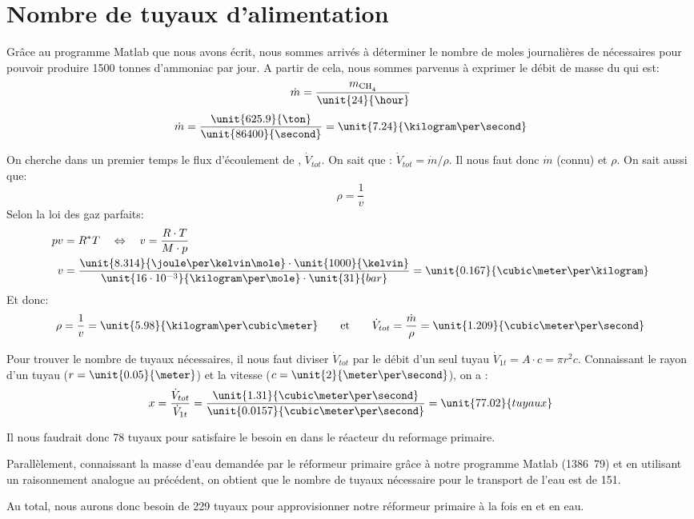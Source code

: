 \section{Nombre de tuyaux d'alimentation}

Grâce au programme Matlab que nous avons écrit, nous sommes arrivés à déterminer le nombre de moles journalières de  nécessaires pour pouvoir produire 1500 tonnes d'ammoniac par jour. A partir de cela, nous sommes parvenus à exprimer le débit de masse du  qui est:
    $$\dot{m}=\frac{m_{\ce{CH4}}}{\unit{24}{\hour}}$$
    $$\dot{m}=\frac{\unit{625.9}{\ton}}{\unit{86400}{\second}}=\unit{7.24}{\kilogram\per\second}$$

On cherche dans un premier temps le flux d'écoulement de , $\dot{V}_{tot}$. On sait que :
$\dot{V}_{tot}={\dot{m}}/{\rho}$.
Il nous faut donc $\dot{m}$ (connu) et $\rho$. On sait aussi que:
\[ \rho = \frac{1}{v} \]
Selon la loi des gaz parfaits:
\begin{align*}
    pv &= R^{*}T \quad\Leftrightarrow\quad v = \frac{R\cdot T}{M\cdot p} \\
    v &= \frac{\unit{8.314}{\joule\per\kelvin\mole}\cdot\unit{1000}{\kelvin}}{\unit{16\cdot10^{-3}}{\kilogram\per\mole}\cdot\unit{31}{bar}}=\unit{0.167}{\cubic\meter\per\kilogram}
\end{align*}
Et donc:
\[
    \rho = \frac{1}{v} = \unit{5.98}{\kilogram\per\cubic\meter}
    \qquad\text{et}\qquad
    \dot{V}_{tot} = \frac{\dot{m}}{\rho}=\unit{1.209}{\cubic\meter\per\second}
\]

Pour trouver le nombre de tuyaux nécessaires, il nous faut diviser $\dot{V}_{tot}$ par le débit d'un seul tuyau $\dot{V}_{1t} = A\cdot c = \pi r^2 c$. Connaissant le rayon d'un tuyau ($r=\unit{0.05}{\meter}$) et la vitesse ($c=\unit{2}{\meter\per\second}$), on a :
\[
    x = \frac{\dot{V}_{tot}}{\dot{V}_{1t}}
      = \frac{\unit{1.31}{\cubic\meter\per\second}}{\unit{0.0157}{\cubic\meter\per\second}}
      = \unit{77.02}{tuyaux}
\]

Il nous faudrait donc 78 tuyaux pour satisfaire le besoin en  dans le réacteur du reformage primaire.

Parallèlement, connaissant la masse d'eau demandée par le réformeur primaire grâce à notre programme Matlab (\unit{1386.79}{\ton}) et en utilisant un raisonnement analogue au précédent\footnotemark, on obtient que le nombre de tuyaux nécessaire pour le transport de l'eau est de 151.

Au total, nous aurons donc besoin de 229 tuyaux pour approvisionner notre réformeur primaire à la fois en  et en eau.
